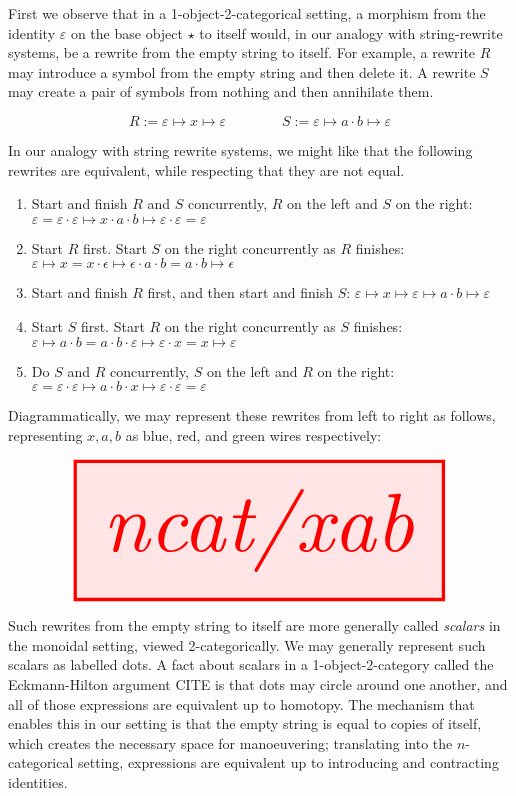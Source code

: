 First we observe that in a 1-object-2-categorical setting, a morphism from the identity $\varepsilon$ on the base object $\star$ to itself would, in our analogy with string-rewrite systems, be a rewrite from the empty string to itself. For example, a rewrite $R$ may introduce a symbol from the empty string and then delete it. A rewrite $S$ may create a pair of symbols from nothing and then annihilate them.

\[R := \varepsilon \mapsto x \mapsto \varepsilon \quad\quad\quad\quad S := \varepsilon \mapsto a \cdot b \mapsto \varepsilon\]

In our analogy with string rewrite systems, we might like that the following rewrites are equivalent, while respecting that they are not equal.

\begin{enumerate}
\item{Start and finish $R$ and $S$ concurrently, $R$ on the left and $S$ on the right: $\varepsilon = \varepsilon \cdot \varepsilon \mapsto x \cdot a \cdot b \mapsto \varepsilon \cdot \varepsilon = \varepsilon$}
\item{Start $R$ first. Start $S$ on the right concurrently as $R$ finishes: $\varepsilon \mapsto x = x \cdot \epsilon \mapsto \epsilon \cdot a \cdot b = a \cdot b \mapsto \epsilon$}
\item{Start and finish $R$ first, and then start and finish $S$: $\varepsilon \mapsto x \mapsto \varepsilon \mapsto a \cdot b \mapsto \varepsilon$}
\item{Start $S$ first. Start $R$ on the right concurrently as $S$ finishes: $\varepsilon \mapsto a \cdot b = a \cdot b \cdot \varepsilon \mapsto \varepsilon \cdot x = x \mapsto \varepsilon $}
\item{Do $S$ and $R$ concurrently, $S$ on the left and $R$ on the right: $\varepsilon = \varepsilon \cdot \varepsilon \mapsto a \cdot b \cdot x \mapsto \varepsilon \cdot \varepsilon = \varepsilon $}
\end{enumerate}

Diagrammatically, we may represent these rewrites from left to right as follows, representing $x,a,b$ as blue, red, and green wires respectively:

\[\resizebox{\textwidth}{!}{\tikzfig{ncat/xab}}\]

Such rewrites from the empty string to itself are more generally called \emph{scalars} in the monoidal setting, viewed 2-categorically. We may generally represent such scalars as labelled dots. A fact about scalars in a 1-object-2-category called the Eckmann-Hilton argument \bR CITE \e is that dots may circle around one another, and all of those expressions are equivalent up to homotopy. The mechanism that enables this in our setting is that the empty string is equal to copies of itself, which creates the necessary space for manoeuvering; translating into the $n$-categorical setting, expressions are equivalent up to introducing and contracting identities.

